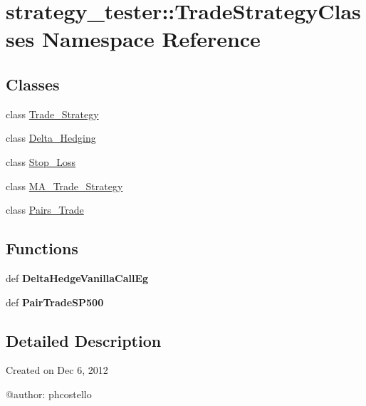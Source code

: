 \hypertarget{namespacestrategy__tester_1_1TradeStrategyClasses}{\section{strategy\-\_\-tester\-:\-:\-Trade\-Strategy\-Classes \-Namespace \-Reference}
\label{namespacestrategy__tester_1_1TradeStrategyClasses}
}
\subsection*{\-Classes}
\begin{DoxyCompactItemize}
\item 
class \hyperlink{classstrategy__tester_1_1TradeStrategyClasses_1_1Trade__Strategy}{\-Trade\-\_\-\-Strategy}
\item 
class \hyperlink{classstrategy__tester_1_1TradeStrategyClasses_1_1Delta__Hedging}{\-Delta\-\_\-\-Hedging}
\item 
class \hyperlink{classstrategy__tester_1_1TradeStrategyClasses_1_1Stop__Loss}{\-Stop\-\_\-\-Loss}
\item 
class \hyperlink{classstrategy__tester_1_1TradeStrategyClasses_1_1MA__Trade__Strategy}{\-M\-A\-\_\-\-Trade\-\_\-\-Strategy}
\item 
class \hyperlink{classstrategy__tester_1_1TradeStrategyClasses_1_1Pairs__Trade}{\-Pairs\-\_\-\-Trade}
\end{DoxyCompactItemize}
\subsection*{\-Functions}
\begin{DoxyCompactItemize}
\item 
\hypertarget{namespacestrategy__tester_1_1TradeStrategyClasses_ac85572fa2344ed6987a0b19bbda2b2b2}{def {\bfseries \-Delta\-Hedge\-Vanilla\-Call\-Eg}}\label{namespacestrategy__tester_1_1TradeStrategyClasses_ac85572fa2344ed6987a0b19bbda2b2b2}

\item 
\hypertarget{namespacestrategy__tester_1_1TradeStrategyClasses_ad15ccba896c2aad602399bf6957ee586}{def {\bfseries \-Pair\-Trade\-S\-P500}}\label{namespacestrategy__tester_1_1TradeStrategyClasses_ad15ccba896c2aad602399bf6957ee586}

\end{DoxyCompactItemize}


\subsection{\-Detailed \-Description}
\begin{DoxyVerb}
Created on Dec 6, 2012

@author: phcostello
\end{DoxyVerb}
 